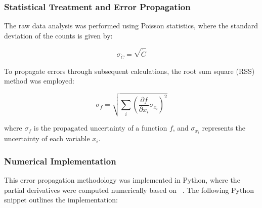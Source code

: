 \subsubsection{Statistical Treatment and Error Propagation}

The raw data analysis was performed using Poisson statistics, where the standard deviation of the counts is given by:

\begin{equation}
\sigma_{\dot{C}} = \sqrt{\dot{C}}
\end{equation}

To propagate errors through subsequent calculations, the root sum square (RSS) method was employed:

\begin{equation}
\sigma_f = \sqrt{\sum_{i} \left( \frac{\partial f}{\partial x_i} \sigma_{x_i} \right)^2}
\end{equation}

where $\sigma_f$ is the propagated uncertainty of a function $f$, and $\sigma_{x_i}$ represents the uncertainty of each variable $x_i$.

\subsubsection{Numerical Implementation}

This error propagation methodology was implemented in Python, where the partial derivatives were computed numerically based on ~\cite{Moffat1988}. 
The following Python snippet outlines the implementation:

